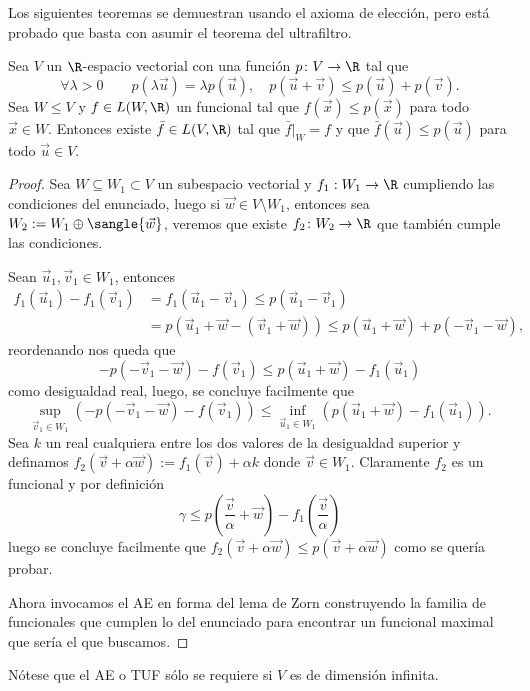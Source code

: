 \documentclass[topologia-analisis.tex]{subfiles}
\begin{document}
Los siguientes teoremas se demuestran usando el axioma de elección, pero está probado que basta con asumir el teorema del ultrafiltro.
\begin{thmi}
	Sea $V$ un $\R$-espacio vectorial con una función $p \colon V \to \R$ tal que\footnotemark{}
	\begin{equation}
		\forall \lambda > 0 \qquad p(\lambda\vec u) = \lambda p(\vec u), \quad
		p(\vec u + \vec v) \le p(\vec u) + p(\vec v).
		\label{eqn:hahn_ban_axioms}
	\end{equation}
	Sea $W \le V$ y $f \in L(W, \R)$ un funcional tal que $f(\vec x) \le p(\vec x)$ para todo $\vec x \in W$.
	Entonces existe $\bar f \in L(V, \R)$ tal que $\bar f|_W = f$ y que $\bar f(\vec u) \le p(\vec u)$ para todo $\vec u\in V$.
\end{thmi}
\begin{proof}
	Sea $W\subseteq W_1\subset V$ un subespacio vectorial y $f_1:W_1\to \R$ cumpliendo las condiciones del enunciado,
	luego si $\vec w\in V\setminus W_1$, entonces sea $W_2 := W_1\oplus\sangle{\vec w}$, veremos que existe $f_2\colon W_2\to\R$
	que también cumple las condiciones.
	\par
	Sean $\vec u_1,\vec v_1\in W_1$, entonces
	\begin{align*}
		f_1(\vec u_1) - f_1(\vec v_1) &= f_1(\vec u_1 - \vec v_1) \le p(\vec u_1 - \vec v_1) \\
		&= p(\vec u_1 + \vec w - (\vec v_1 + \vec w)) \le p(\vec u_1 + \vec w) + p(-\vec v_1 - \vec w),
	\end{align*}
	reordenando nos queda que
	$$ -p(-\vec v_1 - \vec w) - f(\vec v_1) \le p(\vec u_1 + \vec w) - f_1(\vec u_1) $$
	como desigualdad real, luego, se concluye facilmente que
	$$ \sup_{\vec v_1\in W_1} \left( -p(-\vec v_1 - \vec w) - f(\vec v_1) \right)
	\le \inf_{\vec u_1\in W_1} \left( p(\vec u_1 + \vec w) - f_1(\vec u_1) \right). $$
	Sea $ k $ un real cualquiera entre los dos valores de la desigualdad superior y definamos $f_2(\vec v + \alpha\vec w) := f_1(\vec v) + \alpha k$
	donde $\vec v\in W_1$.
	Claramente $f_2$ es un funcional y por definición
	$$ \gamma \le p\left( \frac{\vec v}{\alpha} + \vec w \right) - f_1\left( \frac{\vec v}{\alpha} \right) $$
	luego se concluye facilmente que $f_2(\vec v + \alpha\vec w) \le p(\vec v + \alpha\vec w)$ como se quería probar.
	\par
	Ahora invocamos el AE en forma del lema de Zorn construyendo la familia de funcionales que cumplen lo del enunciado
	para encontrar un funcional maximal que sería el que buscamos.
\end{proof}
Nótese que el AE o TUF sólo se requiere si $V$ es de dimensión infinita.
\end{document}
